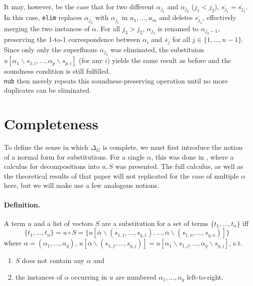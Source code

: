 \documentclass[a4paper, 11pt]{report}
\begin{document}
It may, however, be the case that for two different $\alpha_{j_1}$ and $\alpha_{j_2}$ ($j_1 < j_2$), $\overline{s_{j_1}} = \overline{s_{j_2}}$. In this case, \texttt{elim} replaces $\alpha_{j_2}$ with $\alpha_{j_1}$ in $u_1,\dots,u_m$ and deletes $\overline{s_{j_2}}$, effectively merging the two instances of $\alpha$. For all $j_3 > j_2$, $\alpha_{j_3}$ is renamed to $\alpha_{j_3 - 1}$, preserving the 1-to-1 correspondence between $\alpha_i$ and $\overline{s_j}$ for all $j \in \{1,\dots,n-1\}$. Since only only the superfluous $\alpha_{j_2}$ was eliminated, the substituion $u[\alpha_1\backslash s_{1,i},\dots,\alpha_p\backslash s_{p,i}]$ (for any $i$) yields the same result as before and the soundness condition is still fulfilled.\\

\texttt{nub} then merely repeats this soundness-preserving operation until no more duplicates can be eliminated.

\section{Completeness}

To define the sense in which $\Delta_G$ is complete, we must first introduce the notion of a normal form for substitutions. For a single $\alpha$, this was done in \cite[Ch. 4]{Hetzl2012}, where a calculus for decompositions into $u,S$ was presented. The full calculus, as well as the theoretical results of that paper will not replicated for the case of multiple $\alpha$ here, but we will make use a few analogous notions.

\paragraph{Definition.} A term $u$ and a list of vectors $S$ are a substitution for a set of terms $\{t_1,\dots,t_n\}$ iff
$$
  \{t_1,\dots,t_n\} =
  u \circ S =
  \{u[\overline{\alpha}\backslash(s_{1,1},\dots,s_{q,1}),\dots,\overline{\alpha}\backslash(s_{1,n},\dots,s_{q,n})]\}
$$
where $\overline{\alpha} = (\alpha_1,\dots,\alpha_q)$, $u[\overline{\alpha}\backslash(s_{1,j},\dots,s_{q,j})] = u[\alpha_1\backslash s_{1,j},\dots,\alpha_q\backslash s_{q,j}]$, s.t.
\begin{enumerate}
  \item $S$ does not contain any $\alpha$ and
  \item the instances of $\alpha$ occurring in $u$ are numbered $\alpha_1,\dots,\alpha_q$ left-to-right.
\end{enumerate}
\end{document}
